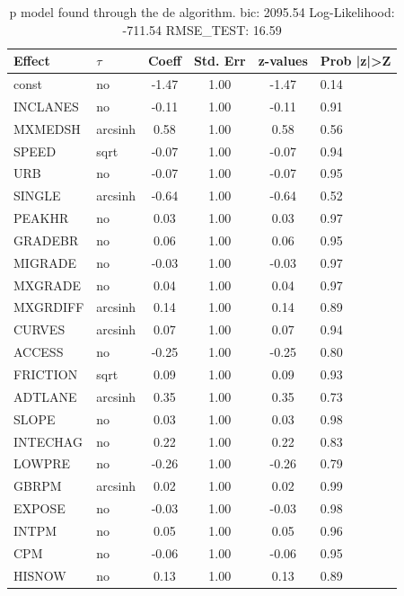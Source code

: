 \begin{table}
	\caption{p model found through the de algorithm. bic: 2095.54 Log-Likelihood: -711.54 RMSE_TEST: 16.59}
	\begin{center}
		\begin{tabular}{|l|l|c|c|c|l|}
			\hline
			Effect & $\tau$ & Coeff & Std. Err & z-values & Prob |z|>Z \\
			\hline
			const & no & -1.47 & 1.00 & -1.47 & 0.14 \\
			\hline
			INCLANES & no & -0.11 & 1.00 & -0.11 & 0.91 \\
			\hline
			MXMEDSH & arcsinh & 0.58 & 1.00 & 0.58 & 0.56 \\
			\hline
			SPEED & sqrt & -0.07 & 1.00 & -0.07 & 0.94 \\
			\hline
			URB & no & -0.07 & 1.00 & -0.07 & 0.95 \\
			\hline
			SINGLE & arcsinh & -0.64 & 1.00 & -0.64 & 0.52 \\
			\hline
			PEAKHR & no & 0.03 & 1.00 & 0.03 & 0.97 \\
			\hline
			GRADEBR & no & 0.06 & 1.00 & 0.06 & 0.95 \\
			\hline
			MIGRADE & no & -0.03 & 1.00 & -0.03 & 0.97 \\
			\hline
			MXGRADE & no & 0.04 & 1.00 & 0.04 & 0.97 \\
			\hline
			MXGRDIFF & arcsinh & 0.14 & 1.00 & 0.14 & 0.89 \\
			\hline
			CURVES & arcsinh & 0.07 & 1.00 & 0.07 & 0.94 \\
			\hline
			ACCESS & no & -0.25 & 1.00 & -0.25 & 0.80 \\
			\hline
			FRICTION & sqrt & 0.09 & 1.00 & 0.09 & 0.93 \\
			\hline
			ADTLANE & arcsinh & 0.35 & 1.00 & 0.35 & 0.73 \\
			\hline
			SLOPE & no & 0.03 & 1.00 & 0.03 & 0.98 \\
			\hline
			INTECHAG & no & 0.22 & 1.00 & 0.22 & 0.83 \\
			\hline
			LOWPRE & no & -0.26 & 1.00 & -0.26 & 0.79 \\
			\hline
			GBRPM & arcsinh & 0.02 & 1.00 & 0.02 & 0.99 \\
			\hline
			EXPOSE & no & -0.03 & 1.00 & -0.03 & 0.98 \\
			\hline
			INTPM & no & 0.05 & 1.00 & 0.05 & 0.96 \\
			\hline
			CPM & no & -0.06 & 1.00 & -0.06 & 0.95 \\
			\hline
			HISNOW & no & 0.13 & 1.00 & 0.13 & 0.89 \\

\end{tabular}
\end{center}
\end{table}
